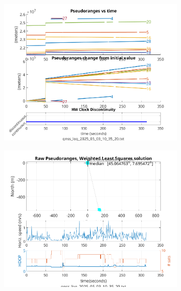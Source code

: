         \begin{figure}[h!]
            \centering
            \begin{subfigure}{0.23\textwidth}
                \includegraphics[width=\textwidth]{images/tests/Monte_Cappuccini/Spoofing/task6_figures/Samsung_A51_Monte_Cappuccini_fig1.png}
                \caption{}
            \end{subfigure}
            \hfill
            \begin{subfigure}{0.23\textwidth}
                \includegraphics[width=\textwidth]{images/tests/Monte_Cappuccini/Spoofing/task6_figures/Samsung_A51_Monte_Cappuccini_fig4.png}
                \caption{}
            \end{subfigure}
        \end{figure}

